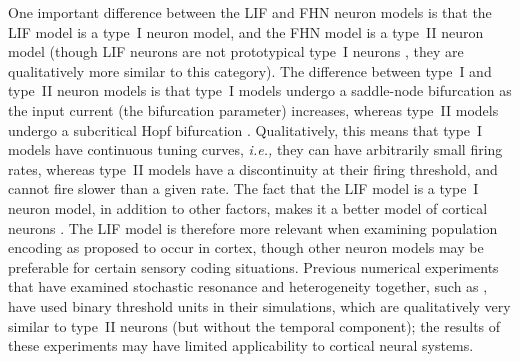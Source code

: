 \documentclass[12pt]{article}
\newcommand{\ie}{\emph{i.e., }}
\begin{document}
One important difference between the LIF and FHN neuron models is that the LIF model is a type~I neuron model, and the FHN model is a type~II neuron model (though LIF neurons are not prototypical type~I neurons \citep{Mato2008}, they are qualitatively more similar to this category). The difference between type~I and type~II neuron models is that type~I models undergo a saddle-node bifurcation as the input current (the bifurcation parameter) increases, whereas type~II models undergo a subcritical Hopf bifurcation \citep{Mato2008}. Qualitatively, this means that type~I models have continuous tuning curves, \ie they can have arbitrarily small firing rates, whereas type~II models have a discontinuity at their firing threshold, and cannot fire slower than a given rate. The fact that the LIF model is a type~I neuron model, in addition to other factors, makes it a better model of cortical neurons \citep{Koch1999}. The LIF model is therefore more relevant when examining population encoding as proposed to occur in cortex, though other neuron models may be preferable for certain sensory coding situations. Previous numerical experiments that have examined stochastic resonance and heterogeneity together, such as \cite{Stocks2000,McDonnell2006}, have used binary threshold units in their simulations, which are qualitatively very similar to type~II neurons (but without the temporal component); the results of these experiments may have limited applicability to cortical neural systems.
\end{document}
